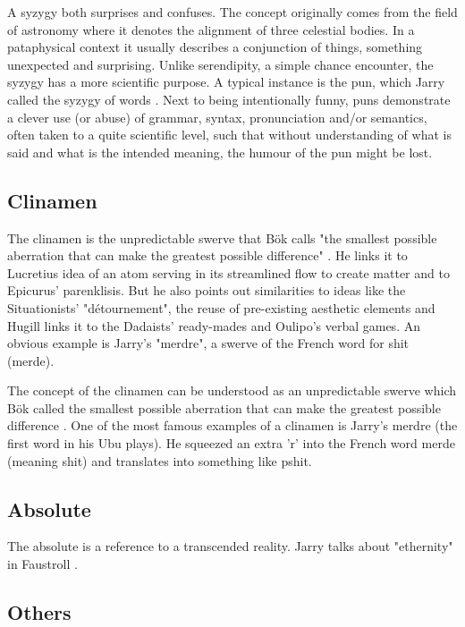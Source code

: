 A syzygy both surprises and confuses. The concept originally comes from the field of astronomy where it denotes the alignment of three celestial bodies. In a pataphysical context it usually describes a conjunction of things, something unexpected and surprising. Unlike serendipity, a simple chance encounter, the syzygy has a more scientific purpose. A typical instance is the pun, which Jarry called the syzygy of words \citep{Jarry1996}. Next to being intentionally funny, puns demonstrate a clever use (or abuse) of grammar, syntax, pronunciation and/or semantics, often taken to a quite scientific level, such that without understanding of what is said and what is the intended meaning, the humour of the pun might be lost.


\subsection{Clinamen}

The clinamen is the unpredictable swerve that Bök calls "the smallest possible aberration that can make the greatest possible difference"  \citep[p.43]{Bok2002}. He links it to Lucretius idea of an atom serving in its streamlined flow to create matter and to Epicurus' parenklisis. But he also points out similarities to ideas like the Situationists' "détournement", the reuse of pre-existing aesthetic elements and Hugill links it to the Dadaists' ready-mades and Oulipo's verbal games. An obvious example is Jarry's "merdre", a swerve of the French word for shit (merde).

The concept of the clinamen can be understood as an unpredictable swerve which Bök called the smallest possible aberration that can make the greatest possible difference \citep{Bok2002}. One of the most famous examples of a clinamen is Jarry's merdre (the first word in his Ubu plays). He squeezed an extra 'r' into the French word merde (meaning shit) and translates into something like pshit.


\subsection{Absolute}

The absolute is a reference to a transcended reality. Jarry talks about "ethernity" in Faustroll \citep[p.104]{Jarry1996}.


\subsection*{Others}

